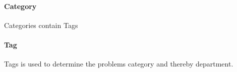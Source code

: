 \paragraph{Category} Categories contain Tags

\paragraph{Tag} Tags is used to determine the problems category and thereby department. 


